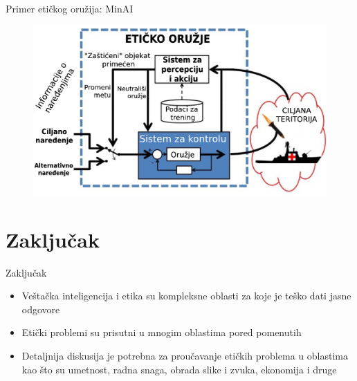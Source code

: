 \documentclass[14pt, aspectratio=169]{beamer}
\begin{document}
\begin{frame}{Primer etičkog oružija: MinAI}
    \begin{figure}[h!]
        \begin{center}
            \includegraphics[scale=0.205]{minAI_slideovi.jpg}
        \end{center}
        \label{fig:minAI}
    \end{figure}
\end{frame}

\section{Zaključak}

\begin{frame}{Zaključak}
    \begin{itemize}
        \item Veštačka inteligencija i etika su kompleksne oblasti za koje je teško dati jasne odgovore
        \item Etički problemi su prisutni u mnogim oblastima pored pomenutih
        \item Detaljnija diskusija je potrebna za proučavanje etičkih problema u oblastima kao što su umetnost, radna snaga, obrada slike i zvuka, ekonomija i druge
    \end{itemize}
\end{frame}
\end{document}

